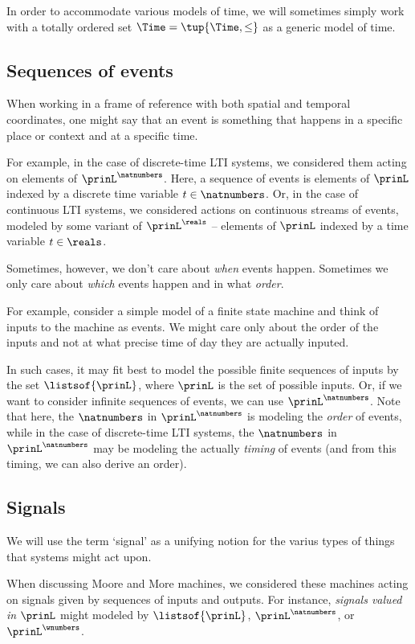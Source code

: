 In order to accommodate various models of time, we will sometimes simply work with a totally ordered set $\Time = \tup{\Time, \leq}$ as a generic model of time. 

\subsection{Sequences of events}

When working in a frame of reference with both spatial and temporal coordinates, one might say that an event is something that happens in a specific place or context and at a specific time. 

For example, in the case of discrete-time LTI systems, we considered them acting on elements of $\prinL^\natnumbers$. Here, a sequence of events is elements of $\prinL$ indexed by a discrete time variable $t \in \natnumbers$. Or, in the case of continuous LTI systems, we considered actions on continuous streams of events, modeled by some variant of $\prinL^\reals$ -- elements of $\prinL$ indexed by a time variable $t \in \reals$. 

Sometimes, however, we don't care about \emph{when} events happen. Sometimes we only care about  \emph{which} events happen and in what \emph{order}. 

For example, consider a simple model of a finite state machine and think of inputs to the machine as events. We might care only about the order of the inputs and not at what precise time of day they are actually inputed. 

In such cases, it may fit best to model the possible finite sequences of inputs by the set $\listsof{\prinL}$, where $\prinL$ is the set of possible inputs. Or, if we want to consider infinite sequences of events, we can use $\prinL^\natnumbers$. Note that here, the $\natnumbers$ in $\prinL^\natnumbers$ is modeling the \emph{order} of events, while in the case of discrete-time LTI systems, the $\natnumbers$ in $\prinL^\natnumbers$ may be modeling the actually \emph{timing} of events (and from this timing, we can also derive an order). 

\subsection{Signals}

We will use the term `signal' as a unifying notion for the varius types of things that systems might act upon. 

When discussing Moore and More machines, we considered these machines acting on signals given by sequences of inputs and outputs. For instance, \emph{signals valued in} $\prinL$ might modeled by $\listsof{\prinL}$, $\prinL^\natnumbers$, or $\prinL^\wnumbers$. 

